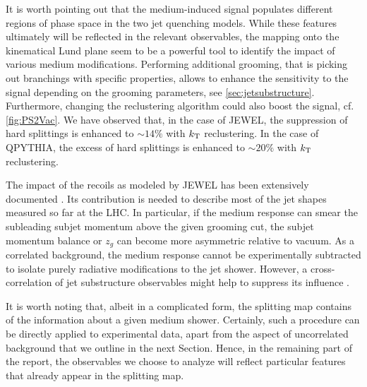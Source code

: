 It is worth pointing out that the medium-induced signal populates different regions of phase space in the two jet quenching models. 
While these features ultimately will be reflected in the relevant observables, the mapping onto the kinematical Lund plane seem to be a powerful tool to identify the impact of various medium modifications. Performing additional grooming, that is picking out branchings with specific properties, allows to enhance the sensitivity to the signal depending on the grooming parameters, see \autoref{sec:jetsubstructure}. Furthermore, changing the reclustering algorithm could also boost the signal, cf. \autoref{fig:PS2Vac}.
We have observed that, in the case of JEWEL, the suppression of hard splittings is enhanced to $\sim 14\%$ with $k_{\rm \tiny T}$ reclustering. In the case of QPYTHIA, the excess of hard splittings is enhanced to $\sim 20\%$ with $k_{\rm \tiny T}$ reclustering.

The impact of the recoils as modeled by JEWEL has been extensively documented \cite{KunnawalkamElayavalli:2017hxo,Milhano:2017nzm}. Its contribution is needed to describe most of the jet shapes measured so far at the LHC. In particular, if the medium response can smear the subleading subjet momentum above the given grooming cut, the subjet momentum balance or $z_{g}$ can become more asymmetric relative to vacuum.   As a correlated background, the medium response cannot be experimentally subtracted to isolate purely radiative modifications to the jet shower. However, a cross-correlation of jet substructure observables might help to suppress its influence \cite{Milhano:2017nzm}.

It is worth noting that, albeit in a complicated form, the splitting map contains of the information about a given medium shower. Certainly, such a procedure can be directly applied to experimental data, apart from the aspect of uncorrelated background that we outline in the next Section. Hence, in the remaining part of the report, the observables we choose to analyze will reflect particular features that already appear in the splitting map.



